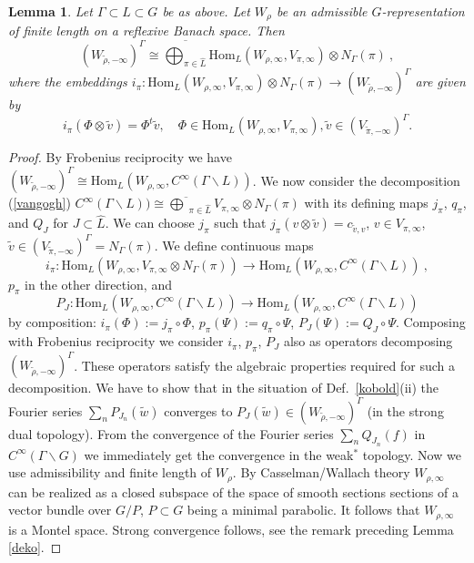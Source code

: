 \documentclass[10]{amsart}
\newtheorem{lem}[thm]{Lemma}
\theoremstyle{remark}
\theoremstyle{definition}
\numberwithin{equation}{section}
\newcommand{\Hom}{\mathrm{Hom}}
\begin{document}
{\begin{lem}\label{kirchner}
Let $\Gamma\subset L\subset G$ be as above. Let $W_\rho$ be an admissible $G$-representation of finite length on a reflexive Banach space. Then
$$  (W_{\tilde \rho,-\infty})^\Gamma\cong \overline{\bigoplus_{\pi\in\widehat L}}  \Hom_L(W_{\rho,\infty}, V_{\pi,\infty})\otimes N_\Gamma(\pi)\ ,$$
where the embeddings $i_\pi : \Hom_L(W_{\rho,\infty}, V_{\pi,\infty})\otimes N_\Gamma(\pi)\rightarrow (W_{\tilde \rho,-\infty})^\Gamma$ are given by 
$$i_\pi(\Phi\otimes\tilde v)= \Phi^t\tilde v,\quad \Phi\in \Hom_L(W_{\rho,\infty}, V_{\pi,\infty}), \tilde v\in (V_{\tilde\pi,-\infty})^\Gamma.$$
\end{lem}
\begin{proof} By Frobenius reciprocity we have $(W_{\tilde \rho,-\infty})^\Gamma\cong \Hom_L(W_{\rho,\infty},C^\infty(\Gamma\backslash L))$. We now consider the decomposition  (\ref{vangogh}) $C^\infty(\Gamma\backslash L))\cong \overline{\bigoplus}_{\pi\in\widehat L}
 V_{\pi,\infty}\otimes N_\Gamma(\pi)$ with its defining maps $j_\pi$, $q_\pi$, and $Q_J$ for $J\subset\widehat L$. We can choose $j_\pi$ such that $j_\pi(v\otimes \tilde v)=c_{\tilde v, v}$,  $v\in V_{\pi,\infty}$, $\tilde v\in (V_{\tilde\pi,-\infty})^\Gamma=N_\Gamma(\pi)$.  We define continuous maps 
$$i_\pi: \Hom_L(W_{\rho,\infty}, V_{\pi,\infty}\otimes N_\Gamma(\pi))\rightarrow\Hom_L(W_{\rho,\infty},C^\infty(\Gamma\backslash L))\ ,$$
$p_\pi$ in the other direction, and
$$ P_J: \Hom_L(W_{\rho,\infty},C^\infty(\Gamma\backslash L))\rightarrow\Hom_L(W_{\rho,\infty},C^\infty(\Gamma\backslash L))
$$ 
by composition: $i_\pi(\Phi):=j_\pi\circ\Phi$, $p_\pi(\Psi):=q_\pi\circ\Psi$, $P_J(\Psi):=Q_J\circ\Psi$. Composing with Frobenius reciprocity we consider $i_\pi$, $p_\pi$, $P_J$ also as operators
decomposing  $(W_{\tilde \rho,-\infty})^\Gamma$. These operators satisfy the algebraic properties required for such a decomposition. We have to show that in the situation of  Def.~\ref{kobold}(ii) the
Fourier series $\sum_n P_{J_n}(\tilde w)$ converges to $P_J(\tilde w)\in (W_{\tilde \rho,-\infty})^\Gamma$ (in the strong dual topology). From the convergence of the Fourier
series $\sum_n Q_{J_n}(f)$ in $C^\infty(\Gamma\backslash G)$ we immediately get the convergence in the weak$^*$ topology. Now we use admissibility and finite length
of $W_\rho$. By Casselman/Wallach theory $W_{\rho,\infty}$ can be realized as a closed subspace of the space of smooth sections sections of a vector bundle over $G/P$, $P\subset G$
being a minimal parabolic. It follows that $W_{\rho,\infty}$ is a Montel space. Strong convergence follows, see the remark preceding Lemma \ref{deko}. 
\end{proof}

}
\end{document}
